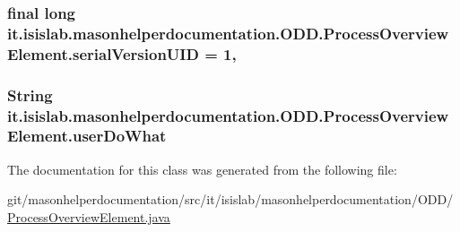 \hypertarget{classit_1_1isislab_1_1masonhelperdocumentation_1_1_o_d_d_1_1_process_overview_element_a45b2a88aa02008be6bb02926600ac8bd}{
\subsubsection[{serial\-Version\-U\-I\-D}]{\setlength{\rightskip}{0pt plus 5cm}final long it.\-isislab.\-masonhelperdocumentation.\-O\-D\-D.\-Process\-Overview\-Element.\-serial\-Version\-U\-I\-D = 1\hspace{0.3cm}{\ttfamily [static]}, {\ttfamily [private]}}}\label{classit_1_1isislab_1_1masonhelperdocumentation_1_1_o_d_d_1_1_process_overview_element_a45b2a88aa02008be6bb02926600ac8bd}
\hypertarget{classit_1_1isislab_1_1masonhelperdocumentation_1_1_o_d_d_1_1_process_overview_element_adf547a3ee1fe686d4e7cb2a446761a52}{
\subsubsection[{user\-Do\-What}]{\setlength{\rightskip}{0pt plus 5cm}String it.\-isislab.\-masonhelperdocumentation.\-O\-D\-D.\-Process\-Overview\-Element.\-user\-Do\-What\hspace{0.3cm}{\ttfamily [package]}}}\label{classit_1_1isislab_1_1masonhelperdocumentation_1_1_o_d_d_1_1_process_overview_element_adf547a3ee1fe686d4e7cb2a446761a52}


The documentation for this class was generated from the following file\-:\begin{DoxyCompactItemize}
\item 
git/masonhelperdocumentation/src/it/isislab/masonhelperdocumentation/\-O\-D\-D/\hyperlink{_process_overview_element_8java}{Process\-Overview\-Element.\-java}\end{DoxyCompactItemize}
